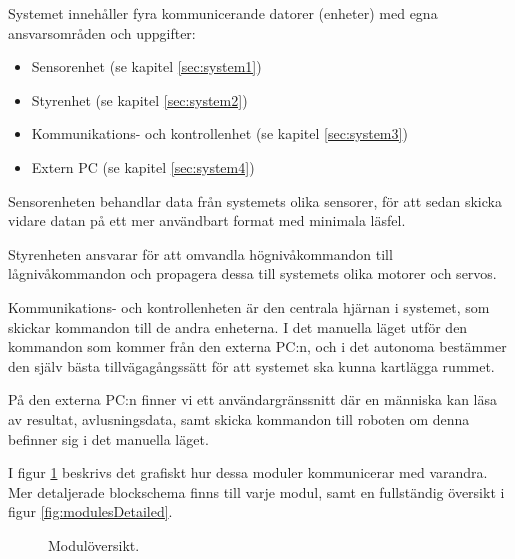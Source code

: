 \documentclass[a4paper,11pt]{article}
\begin{document}
\noindent
Systemet innehåller fyra kommunicerande datorer (enheter) med egna ansvarsområden och uppgifter:

\begin{itemize}
\item Sensorenhet (se kapitel \ref{sec:system1})
\item Styrenhet (se kapitel \ref{sec:system2})
\item Kommunikations- och kontrollenhet (se kapitel \ref{sec:system3})
\item Extern PC (se kapitel \ref{sec:system4})
\end{itemize}

\noindent
Sensorenheten behandlar data från systemets olika sensorer, för att sedan skicka vidare datan på ett mer användbart format med minimala läsfel.

Styrenheten ansvarar för att omvandla högnivåkommandon till lågnivåkommandon och propagera dessa till systemets olika motorer och servos.

Kommunikations- och kontrollenheten är den centrala hjärnan i systemet, som skickar kommandon till de andra enheterna. I det manuella läget utför den kommandon som kommer från den externa PC:n, och i det autonoma bestämmer den själv bästa tillvägagångssätt för att systemet ska kunna kartlägga rummet.

På den externa PC:n finner vi ett användargränssnitt där en människa kan läsa av resultat, avlusningsdata, samt skicka kommandon till roboten om denna befinner sig i det manuella läget.

I figur \ref{fig:modules} beskrivs det grafiskt hur dessa moduler kommunicerar med varandra. Mer detaljerade blockschema finns till varje modul, samt en fullständig översikt i figur \ref{fig:modulesDetailed}.

\begin{figure}
    \caption{Modulöversikt.}
    \label{fig:modules}
\end{figure}
\end{document}
